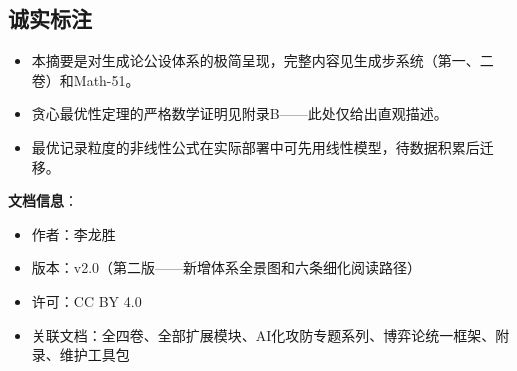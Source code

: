 \documentclass[11pt,a4paper]{article}
\begin{document}
\subsection{诚实标注}

\begin{itemize}
    \item 本摘要是对生成论公设体系的极简呈现，完整内容见生成步系统（第一、二卷）和Math-51。
    \item 贪心最优性定理的严格数学证明见附录B——此处仅给出直观描述。
    \item 最优记录粒度的非线性公式在实际部署中可先用线性模型，待数据积累后迁移。
\end{itemize}

\vspace{5mm}
\noindent\textbf{文档信息}：
\begin{itemize}
    \item 作者：李龙胜
    \item 版本：v2.0（第二版——新增体系全景图和六条细化阅读路径）
    \item 许可：CC BY 4.0
    \item 关联文档：全四卷、全部扩展模块、AI化攻防专题系列、博弈论统一框架、附录、维护工具包
\end{itemize}
\end{document}
